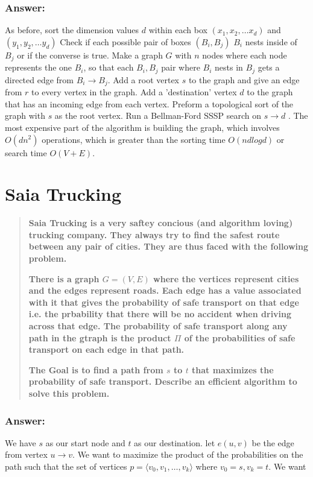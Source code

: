 \documentclass[titlepage]{article}
\theoremstyle{definition}
\begin{document}
  \subsubsection{Answer:}
    As before, sort the dimension values $d$ within each box $(x_1, x_2, \dots x_d)$ and
    $(y_1, y_2, \dots y_d)$ Check if each possible pair of boxes $(B_i, B_j)$
    $B_i$ nests inside of $B_j$ or if the converse is true. Make a graph $G$
    with $n$ nodes where each node represents the one $B_i$, so that each
    $B_i, B_j$ pair where $B_i$ nests in $ B_j$ gets a directed edge from $B_i
    \to B_j$. Add a root vertex $s$ to the graph and give an edge from $r$ to
    every vertex in the graph. Add a 'destination' vertex $d$ to the graph
    that has an incoming edge from each vertex. Preform a topological sort of the
    graph with $s$ as the root vertex. Run a Bellman-Ford SSSP search on $s
    \rightarrow d$ . The most expensive part of the algorithm is building the
    graph, which involves $O(dn^2)$ operations, which is greater than the
    sorting time $O(nd log d)$ or search time $O(V + E)$. 



\section{Saia Trucking}
  \begin{quote}
    \textbf{Saia Trucking is a very saftey concious (and algorithm loving)
    trucking company. They always try to find the safest route between any pair
    of cities. They are thus faced with the following problem.}

    \textbf{There is a graph $G = (V,E)$ where the vertices represent cities and the edges
    represent roads. Each edge has a value associated with it that gives the
    probability of safe transport on that edge i.e. the prbability that there will
    be no accident when driving across that edge. The probability of safe transport
    along any path in the gtraph is the product $\Pi$ of the probabilities of safe
    transport on each edge in that path.}

    \textbf{The Goal is to find a path from $s$ to $t$ that maximizes the probability of
    safe transport. Describe an efficient algorithm to solve this problem.  }
  \end{quote}
  \subsubsection{Answer:}
    We have $s$ as our start node and $t$ as our destination. let $e(u,v)$ be the
    edge from vertex $u \rightarrow v$. We want to maximize the product of the
    probabilities on the path such that the set of vertices $p = \langle v_0, v_1,
    \dots, v_k \rangle$ where $v_0 = s, v_k = t$. We want
\end{document}
